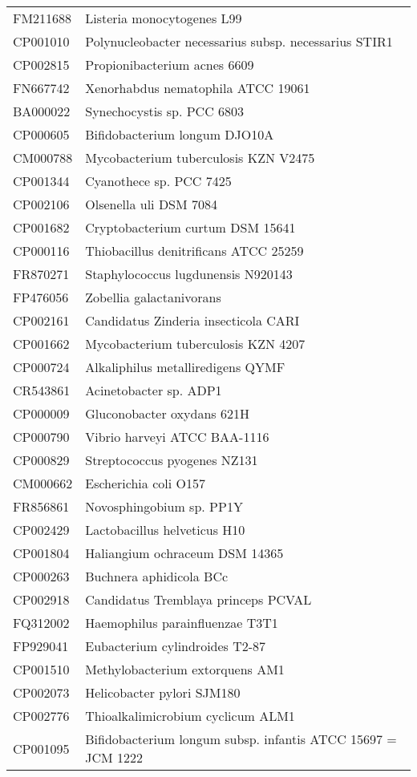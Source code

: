 \begin{longtable}{ll}
FM211688 & Listeria monocytogenes L99\\
CP001010 & Polynucleobacter necessarius subsp. necessarius STIR1\\
CP002815 & Propionibacterium acnes 6609\\
FN667742 & Xenorhabdus nematophila ATCC 19061\\
BA000022 & Synechocystis sp. PCC 6803\\
CP000605 & Bifidobacterium longum DJO10A\\
CM000788 & Mycobacterium tuberculosis KZN V2475\\
CP001344 & Cyanothece sp. PCC 7425\\
CP002106 & Olsenella uli DSM 7084\\
CP001682 & Cryptobacterium curtum DSM 15641\\
CP000116 & Thiobacillus denitrificans ATCC 25259\\
FR870271 & Staphylococcus lugdunensis N920143\\
FP476056 & Zobellia galactanivorans\\
CP002161 & Candidatus Zinderia insecticola CARI\\
CP001662 & Mycobacterium tuberculosis KZN 4207\\
CP000724 & Alkaliphilus metalliredigens QYMF\\
CR543861 & Acinetobacter sp. ADP1\\
CP000009 & Gluconobacter oxydans 621H\\
CP000790 & Vibrio harveyi ATCC BAA-1116\\
CP000829 & Streptococcus pyogenes NZ131\\
CM000662 & Escherichia coli O157\\
FR856861 & Novosphingobium sp. PP1Y\\
CP002429 & Lactobacillus helveticus H10\\
CP001804 & Haliangium ochraceum DSM 14365\\
CP000263 & Buchnera aphidicola BCc\\
CP002918 & Candidatus Tremblaya princeps PCVAL\\
FQ312002 & Haemophilus parainfluenzae T3T1\\
FP929041 & Eubacterium cylindroides T2-87\\
CP001510 & Methylobacterium extorquens AM1\\
CP002073 & Helicobacter pylori SJM180\\
CP002776 & Thioalkalimicrobium cyclicum ALM1\\
CP001095 & Bifidobacterium longum subsp. infantis ATCC 15697 = JCM 1222\\

\end{longtable}
